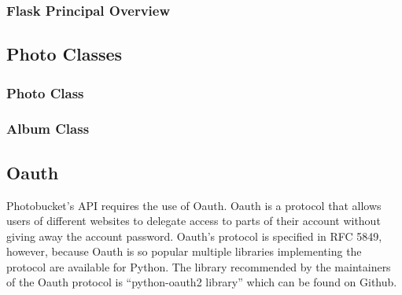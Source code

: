 \documentclass{article}
\begin{document}
\subsubsection{Flask Principal Overview}

\subsection{Photo Classes}

\subsubsection{Photo Class}

\subsubsection{Album Class}

\subsection{Oauth}

Photobucket's API requires the use of Oauth. Oauth is a protocol that allows users of different websites to delegate access
to parts of their account without giving away the account password. Oauth's protocol is specified in RFC 5849, however, because Oauth is so popular multiple libraries implementing the protocol are available for Python. \cite{eranhueniverse_oauth} The library recommended by the maintainers of the Oauth protocol is ``python-oauth2 library'' which can be found on Github. \cite{oauth_code} \cite{simplego_python-oauth2_2011}

\newpage


\end{document}
